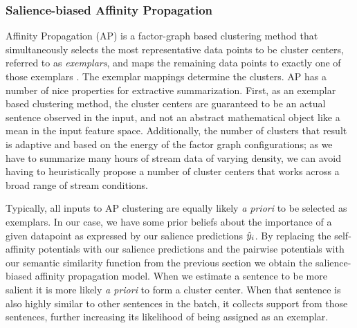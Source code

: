 \subsubsection{Salience-biased Affinity Propagation}


    Affinity Propagation (AP) is a factor-graph based clustering
    method that simultaneously selects the most representative data points 
    to be cluster centers, referred to as \emph{exemplars},  and maps 
    the remaining data points to exactly one of those exemplars 
    \citep{frey2007clustering}. 
    The exemplar mappings determine the clusters.
    AP has a number of nice properties for extractive summarization.
    First, as an exemplar based clustering method, the cluster centers
    are guaranteed to be an actual sentence observed in the input, and not 
    an abstract mathematical object like a mean in the input 
    feature space.
    Additionally, the number of clusters that result is adaptive and 
    based on the energy of the factor graph configurations; as we have to 
    summarize many hours of stream data of varying density, we can avoid
    having to heuristically propose a number of cluster centers that works
    across a broad range of stream conditions.


    Typically, all inputs to AP clustering are equally likely \textit{a priori} to
 be selected as exemplars.
 In our case, we have some prior beliefs about the importance of 
a given datapoint as expressed by our salience predictions $\hat{y}_i$.
By replacing the self-affinity potentials with our salience predictions
and the pairwise potentials with our semantic similarity function from the 
previous section %
we obtain the salience-biased affinity propagation model.
When we estimate a sentence to be more salient it is more likely \textit{a priori}
to form a cluster center. When that sentence is also highly similar to other 
sentences in the batch, it collects support from those sentences, further
increasing its likelihood of being assigned as an exemplar.
 


